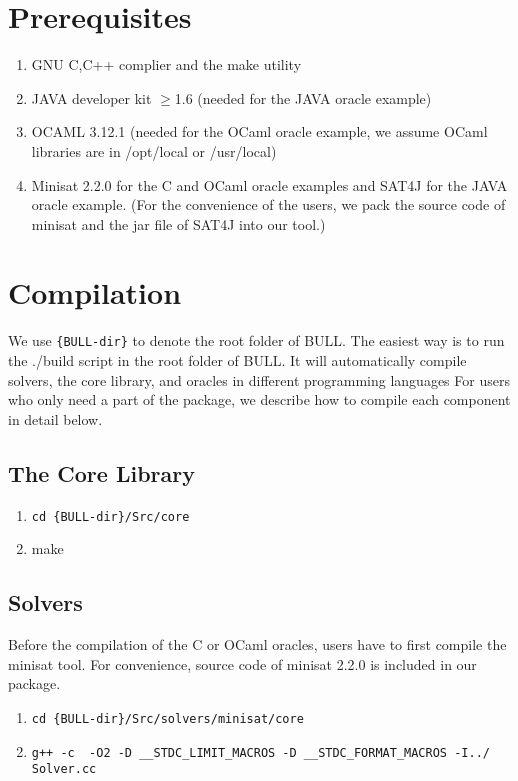 \documentclass{article}
\begin{document}
\section{Prerequisites}
\begin{enumerate}
\item GNU C,C++ complier and the make utility
\item JAVA developer kit $\geq$1.6 (needed for the JAVA oracle example)
\item OCAML  3.12.1 (needed for the OCaml oracle example, we assume OCaml libraries are in /opt/local or /usr/local)
\item Minisat 2.2.0 for the C and OCaml oracle examples and SAT4J for the JAVA oracle example. (For the convenience of the users, we pack the source code of minisat and the jar file of SAT4J into our tool.)

\end{enumerate}

\section{Compilation}

We use \verb"{BULL-dir}" to denote the root folder of BULL.
The easiest way is to run the ./build script in the root folder of BULL. 
It will automatically compile solvers, the core library, and oracles in different programming languages 
For users who only need a part of the package, we describe how to compile each component in detail below.

\subsection{The Core Library}
\begin{enumerate}
\item \verb"cd {BULL-dir}/Src/core"
\item make
\end{enumerate}

\subsection{Solvers}
Before the compilation of the C or OCaml oracles, users have to first compile the minisat tool.
For convenience, source code of minisat 2.2.0 is included in our package.

\begin{enumerate}
\item \verb"cd {BULL-dir}/Src/solvers/minisat/core"
\item {\footnotesize \verb"g++ -c  -O2 -D __STDC_LIMIT_MACROS -D __STDC_FORMAT_MACROS -I../ Solver.cc"}
\end{enumerate}
\end{document}
